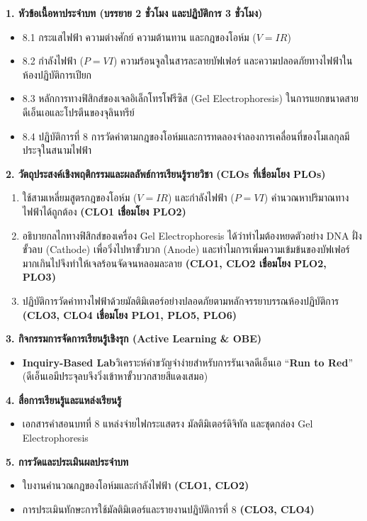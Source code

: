 \cleardoublepage
{}
\begin{planbox}
\noindent\textbf{1. หัวข้อเนื้อหาประจำบท (บรรยาย 2 ชั่วโมง และปฏิบัติการ 3 ชั่วโมง)}
\begin{itemize}
    \item 8.1 กระแสไฟฟ้า ความต่างศักย์ ความต้านทาน และกฎของโอห์ม ($V = IR$)
    \item 8.2 กำลังไฟฟ้า ($P = VI$) ความร้อนจูลในสารละลายบัฟเฟอร์ และความปลอดภัยทางไฟฟ้าในห้องปฏิบัติการเปียก
    \item 8.3 หลักการทางฟิสิกส์ของเจลอิเล็กโทรโฟรีซิส (Gel Electrophoresis) ในการแยกขนาดสายดีเอ็นเอและโปรตีนของจุลินทรีย์
    \item 8.4 ปฏิบัติการที่ 8 การวัดค่าตามกฎของโอห์มและการทดลองจำลองการเคลื่อนที่ของโมเลกุลมีประจุในสนามไฟฟ้า
\end{itemize}

\noindent\textbf{2. วัตถุประสงค์เชิงพฤติกรรมและผลลัพธ์การเรียนรู้รายวิชา (CLOs ที่เชื่อมโยง PLOs)}
\begin{enumerate}
    \item ใช้สามเหลี่ยมสูตรกฎของโอห์ม ($V = IR$) และกำลังไฟฟ้า ($P = VI$) คำนวณหาปริมาณทางไฟฟ้าได้ถูกต้อง \textbf{(CLO1 เชื่อมโยง PLO2)}
    \item อธิบายกลไกทางฟิสิกส์ของเครื่อง Gel Electrophoresis ได้ว่าทำไมต้องหยดตัวอย่าง DNA ฝั่งขั้วลบ (Cathode) เพื่อวิ่งไปหาขั้วบวก (Anode) และทำไมการเพิ่มความเข้มข้นของบัฟเฟอร์มากเกินไปจึงทำให้เจลร้อนจัดจนหลอมละลาย \textbf{(CLO1, CLO2 เชื่อมโยง PLO2, PLO3)}
    \item ปฏิบัติการวัดค่าทางไฟฟ้าด้วยมัลติมิเตอร์อย่างปลอดภัยตามหลักจรรยาบรรณห้องปฏิบัติการ \textbf{(CLO3, CLO4 เชื่อมโยง PLO1, PLO5, PLO6)}
\end{enumerate}

\noindent\textbf{3. กิจกรรมการจัดการเรียนรู้เชิงรุก (Active Learning \& OBE)}
\begin{itemize}
    \item \textbf{Inquiry-Based Lab}\quad วิเคราะห์คำขวัญจำง่ายสำหรับการรันเจลดีเอ็นเอ ``\textbf{Run to Red}'' (ดีเอ็นเอมีประจุลบจึงวิ่งเข้าหาขั้วบวกสายสีแดงเสมอ)
\end{itemize}

\noindent\textbf{4. สื่อการเรียนรู้และแหล่งเรียนรู้}
\begin{itemize}
    \item เอกสารคำสอนบทที่ 8 แหล่งจ่ายไฟกระแสตรง มัลติมิเตอร์ดิจิทัล และชุดกล่อง Gel Electrophoresis
\end{itemize}

\noindent\textbf{5. การวัดและประเมินผลประจำบท}
\begin{itemize}
    \item ใบงานคำนวณกฎของโอห์มและกำลังไฟฟ้า \textbf{(CLO1, CLO2)}
    \item การประเมินทักษะการใช้มัลติมิเตอร์และรายงานปฏิบัติการที่ 8 \textbf{(CLO3, CLO4)}
\end{itemize}
\end{planbox}
\clearpage

